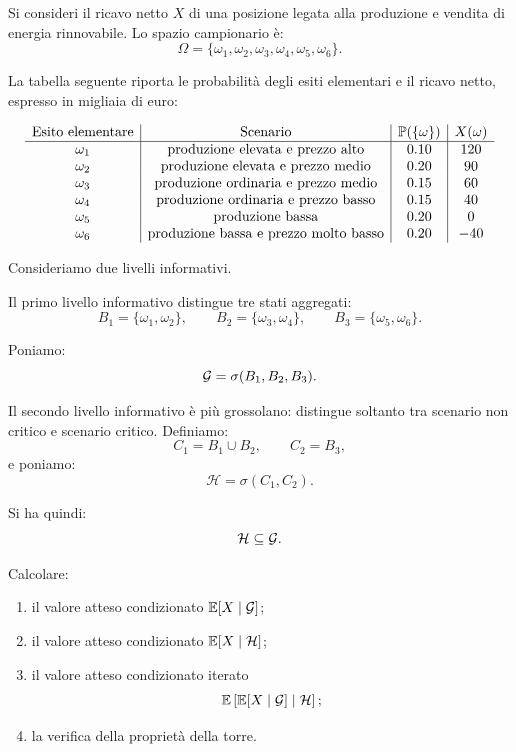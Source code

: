 \begin{exercise}
\label{ex:cap3-condizionamento-iterato-torre}

Si consideri il ricavo netto $X$ di una posizione legata alla produzione e
vendita di energia rinnovabile. Lo spazio campionario \`{e}:
\[
\Omega
=
\{\omega_1,\omega_2,\omega_3,\omega_4,\omega_5,\omega_6\}.
\]

La tabella seguente riporta le probabilit\`{a} degli esiti elementari e il
ricavo netto, espresso in migliaia di euro:

\[
\begin{array}{c|c|c|c}
\text{Esito elementare} & \text{Scenario} &
\mathbb{P}(\{\omega\}) & X(\omega) \\
\hline
\omega_1 & \text{produzione elevata e prezzo alto} & 0.10 & 120 \\
\omega_2 & \text{produzione elevata e prezzo medio} & 0.20 & 90 \\
\omega_3 & \text{produzione ordinaria e prezzo medio} & 0.15 & 60 \\
\omega_4 & \text{produzione ordinaria e prezzo basso} & 0.15 & 40 \\
\omega_5 & \text{produzione bassa} & 0.20 & 0 \\
\omega_6 & \text{produzione bassa e prezzo molto basso} & 0.20 & -40 \\
\end{array}
\]

Consideriamo due livelli informativi.

Il primo livello informativo distingue tre stati aggregati:
\[
B_1=\{\omega_1,\omega_2\},
\qquad
B_2=\{\omega_3,\omega_4\},
\qquad
B_3=\{\omega_5,\omega_6\}.
\]

Poniamo:
\[
\mathcal{G}
=
\sigma(B_1,B_2,B_3).
\]

Il secondo livello informativo \`{e} pi\`{u} grossolano: distingue soltanto tra
scenario non critico e scenario critico. Definiamo:
\[
C_1=B_1\cup B_2,
\qquad
C_2=B_3,
\]
e poniamo:
\[
\mathcal{H}
=
\sigma(C_1,C_2).
\]

Si ha quindi:
\[
\mathcal{H}\subseteq\mathcal{G}.
\]

Calcolare:

\begin{enumerate}
    \item il valore atteso condizionato $\mathbb{E}[X\mid\mathcal{G}]$;

    \item il valore atteso condizionato $\mathbb{E}[X\mid\mathcal{H}]$;

    \item il valore atteso condizionato iterato
    \[
    \mathbb{E}\left[
    \mathbb{E}[X\mid\mathcal{G}]
    \mid
    \mathcal{H}
    \right];
    \]

    \item la verifica della propriet\`{a} della torre.
\end{enumerate}

\medskip

\end{exercise}

